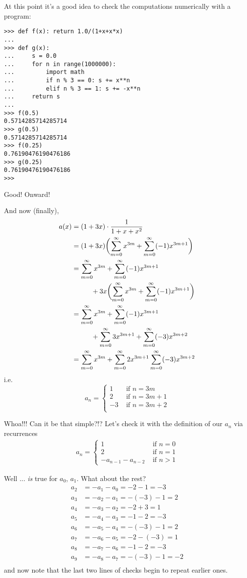 At this point it's a good idea to check the computations numerically with 
a program:
\begin{Verbatim}[frame=single,fontsize=\footnotesize]
>>> def f(x): return 1.0/(1+x+x*x)
...
>>> def g(x):
...     s = 0.0
...     for n in range(1000000):
...         import math
...         if n % 3 == 0: s += x**n
...         elif n % 3 == 1: s += -x**n
...     return s
...
>>> f(0.5)
0.5714285714285714
>>> g(0.5)
0.5714285714285714
>>> f(0.25)
0.76190476190476186
>>> g(0.25)
0.76190476190476186
>>>
\end{Verbatim}
Good! Onward!

And now (finally), 
\begin{align*}
a(x) 
&= (1 + 3x) \cdot \frac{1}{1 + x + x^2} \\
&= 
(1 + 3x) 
\biggl( 
\sum_{m=0}^\infty x^{3m} +
\sum_{m=0}^\infty (-1)x^{3m+1}\biggr) \\
&=  
\sum_{m=0}^\infty x^{3m} +
\sum_{m=0}^\infty (-1)x^{3m+1}  \\
&\hskip 1cm + 3x
\biggl( 
\sum_{m=0}^\infty x^{3m} +
\sum_{m=0}^\infty (-1)x^{3m+1}\biggr) \\
&=   
\sum_{m=0}^\infty x^{3m} +
\sum_{m=0}^\infty (-1)x^{3m+1}  \\
&\hskip 1cm +
\sum_{m=0}^\infty 3x^{3m+1} +
\sum_{m=0}^\infty (-3)x^{3m+2} \\
&=   
\sum_{m=0}^\infty x^{3m} +
\sum_{m=0}^\infty 2x^{3m+1}
\sum_{m=0}^\infty (-3)x^{3m+2} \\
\end{align*}
i.e.
\[
a_n = 
\begin{cases}
1  &\text{ if } n = 3m \\
2  &\text{ if } n = 3m + 1\\
-3 &\text{ if } n = 3m + 2\\
\end{cases}
\]

Whoa!!! Can it be that simple?!?
Let's check it with the definition of our $a_n$ via recurrences
\begin{align*}
a_n = 
\begin{cases}
1 & \text{ if } n = 0 \\
2 & \text{ if } n = 1 \\
-a_{n-1} - a_{n-2} &\text{ if } n > 1 
\end{cases}
\end{align*}

Well ... \textit{is} true for $a_0$, $a_1$.
What about the rest?
\begin{align*}
a_2 &= -a_1 - a_0 = -2-1 = -3 \\
a_3 &= -a_2 -a_1 = -(-3) - 1 = 2 \\
a_4 &= -a_3-a_2 = -2+3 = 1 \\
a_5 &= -a_4-a_3 = -1-2 = -3 \\
a_6 &= -a_5-a_4 = -(-3)-1 = 2 \\
a_7 &= -a_6-a_5 = -2-(-3) = 1 \\
a_8 &= -a_7-a_6 = -1-2 = -3 \\
a_9 &= -a_8-a_7 = -(-3)-1 = -2 \\
\end{align*}
and now note that the last two lines of checks begin to repeat earlier ones.


